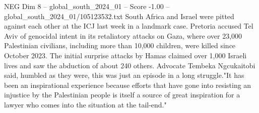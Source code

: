 \begin{textsample}{NEG Dim 8 – global\_south\_2024\_01 – Score -1.00 – global\_south\_2024\_01/105123532.txt}
South Africa and Israel were pitted against each other at the ICJ last week in a landmark case.
Pretoria accused Tel Aviv of genocidal intent in its retaliatory attacks on Gaza, where over 23,000 Palestinian civilians, including more than 10,000 children, were killed since October 2023.
The initial surprise attacks by Hamas claimed over 1,000 Israeli lives and saw the abduction of about 240 others.
Advocate Tembeka Ngcukaitobi said, humbled as they were, this was just an episode in a long struggle."It has been an inspirational experience because efforts that have gone into resisting an injustice by the Palestinian people is itself a source of great inspiration for a lawyer who comes into the situation at the tail-end."

\end{textsample}
